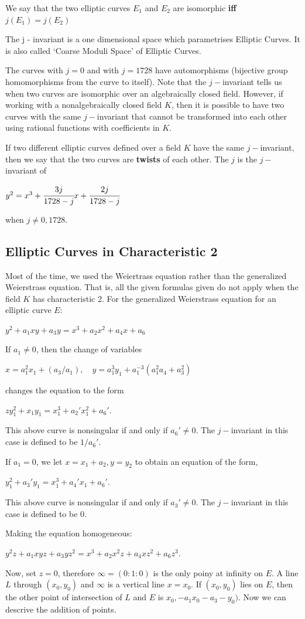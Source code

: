 \documentclass[a4paper, 12pt]{article}
\begin{document}
We say that the two elliptic curves $E_1$ and $E_2$ are isomorphic \textbf{iff} $j(E_1) = j(E_2)$
\par The j - invariant is a one dimensional space which parametrises Elliptic Curves. It is also called `Coarse Moduli Space' of Elliptic Curves.\par
The curves with $j=0$ and with $j=1728$ have automorphisms (bijective group homomorphisms from the curve to itself). Note that the $j-$invariant tells us when two curves are isomorphic over an algebraically closed field. However, if working with a nonalgebraically closed field $K$, then it is possible to have two curves with the same $j-$invariant that cannot be transformed into each other using rational functions with coefficients in $K$.\par
If two different elliptic curves defined over a field $K$ have the same $j-$invariant, then we say that the two curves are \textbf{twists} of each other. The $j$ is the $j-$invariant of
\begin{center} $y^2=x^3+\cfrac{3j}{1728-j}x + \cfrac{2j}{1728-j}$ \end{center}
when $j \neq 0,1728$.
\subsection{Elliptic Curves in Characteristic 2}
Most of the time, we used the Weiertrass equation rather than the generalized Weierstrass equation. That is, all the given formulas given do not apply when the field $K$ has characteristic 2. For the generalized Weierstrass equation for an elliptic curve $E$:
\begin{center} $y^2+a_1xy+a_3y=x^3+a_2x^2+a_4x+a_6$ \end{center}
If $a_1 \neq 0$, then the change of variables
\begin{center} $x=a_1^2x_1+(a_3/a_1),\quad y=a_1^3y_1+a_1^{-3}(a_1^2a_4+a_3^2)$ \end{center}
changes the equation to the form
\begin{center} $zy_1^2+x_1y_1=x_1^3+a_2'x_1^2+a_6'.$ \end{center}
This above curve is nonsingular if and only if $a_6' \neq 0$. The $j-$invariant in this case is defined to be $1/a_6'$.\par
If $a_1=0$, we let $x=x_1+a_2,y=y_2$ to obtain an equation of the form,
\begin{center} $y_1^2+a_3'y_1=x_1^3+a_4'x_1+a_6'.$ \end{center}
This above curve is nonsingular if and only if $a_3' \neq 0$. The $j-$invariant in this case is defined to be 0.\par
Making the equation homogeneous:
\begin{center} $y^2z+a_1xyz+a_3yz^2=x^3+a_2x^2z+a_4xz^2+a_6z^3.$ \end{center}
Now, set $z=0$, therefore $\infty = (0:1:0)$ is the only poiny at infinity on $E$. A line $L$ through $(x_0,y_0)$ and $\infty$ is a vertical line $x=x_0$. If $(x_0,y_0)$ lies on $E$, then the other point of intersection of $L$ and $E$ is $x_0,-a_1x_0-a_3-y_0)$. Now we can descrive the addition of points.
\end{document}
